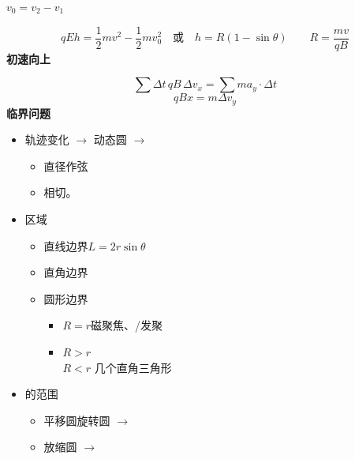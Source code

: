$v_0=v_2-v_1$


\[ qEh=\frac12 mv^2-\frac12 mv_0^2 \quad\text{或}\quad h=R(1-\sin\theta)\qquad R=\frac{mv}{qB} \]
\textbf{初速向上}

\[ \sum\Delta t\,qB\,\Delta v_x=\sum m a_y\cdot\Delta t \] %
\[ qBx=m\Delta v_y \]
\textbf{临界问题}
\begin{itemize}
  \item 轨迹变化 $\to$ 动态圆 $\to$
  \begin{itemize}
    \item 直径作弦
    \item 相切。
  \end{itemize}
  \item 区域
  \begin{itemize}
    \item 直线边界\quad $L=2r\sin\theta$
    \item 直角边界
    \item 圆形边界
    \begin{itemize}
      \item $R=r$\quad 磁聚焦、/发聚
      \item $R>r$ \\ $R<r$ \quad 几个直角三角形\quad {}
    \end{itemize}
  \end{itemize}
  \item {}的范围 %
  \begin{itemize}
    \item 平移圆\red{/}旋转圆 $\to$  %
    \item 放缩圆 $\to$  %
  \end{itemize}
\end{itemize}

\noindent{}\par
\noindent{}\par
\noindent{}
